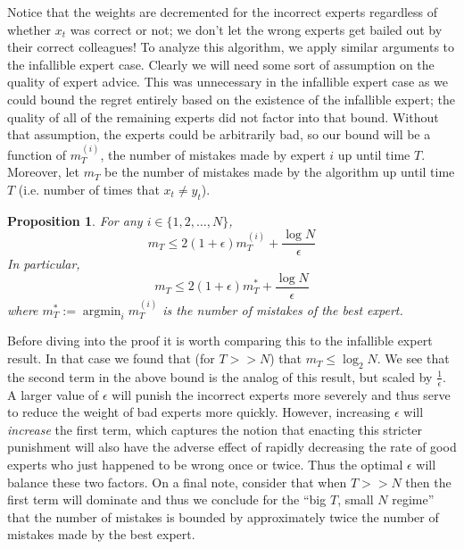 \documentclass[12pt]{article}
\DeclareMathOperator*{\argmin}{argmin}
\newtheorem{prop}{Proposition}
\begin{document}
\bigskip

Notice that the weights are decremented for the incorrect experts regardless of whether $x_t$ was correct or not; we don't let the wrong experts get bailed out by their correct colleagues!
To analyze this algorithm, we apply similar arguments to the infallible expert case. Clearly we will need some sort of assumption on the quality of expert advice. This was unnecessary in the infallible expert
case as we could bound the regret entirely based on the existence of the infallible expert; the quality of all of the remaining experts did not factor into that bound. Without that assumption, the experts could 
be arbitrarily bad, so our bound will be a function of $m_T^{(i)}$, the number of mistakes made by expert $i$ up until time $T$. Moreover, let $m_T$ be the number of mistakes made by the algorithm up until
time $T$ (i.e. number of times that $x_t \neq y_t$). 

\begin{prop}
For any $i \in \{1, 2, \dots, N\}$, 
\[m_T \leq 2(1 + \epsilon)m_T^{(i)} + \frac{\log N}{\epsilon}\]
In particular, 
\[m_T \leq 2(1 + \epsilon)m_T^{*} + \frac{\log N}{\epsilon}\]
where $m_T^{*} := \argmin_{i} m_T^{(i)}$ is the number of mistakes of the best expert. 
\end{prop}
Before diving into the proof it is worth comparing this to the infallible expert result. In that case we found that (for $T >> N$) that $m_T \leq \log_2 N$. We see that the second term in the above 
bound is the analog of this result, but scaled by $\frac{1}{\epsilon}$. A larger value of $\epsilon$ will punish the incorrect experts more severely and thus serve to reduce the weight of bad experts
more quickly. However, increasing $\epsilon$ will \textit{increase} the first term, which captures the notion that enacting this stricter punishment will also have the adverse effect of rapidly decreasing the 
rate of good experts who just happened to be wrong once or twice. Thus the optimal $\epsilon$ will balance these two factors. On a final note, consider that when $T >> N$ then the first term will 
dominate and thus we conclude for the ``big $T$, small $N$ regime'' that the number of mistakes is bounded by approximately twice the number of mistakes made by the best expert. 
\end{document}
